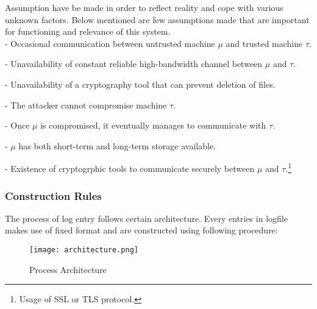 \documentclass[12pt, letter]{article}
\begin{document}
Assumption have be made in order to reflect reality and cope with various unknown factors. Below mentioned are few assumptions made that are important for functioning and relevance of this system.\\

- Occasional communication between untrusted machine $\mu$ and trusted machine $\tau$.

- Unavailability of constant reliable high-bandwidth channel between $\mu$ and $\tau$.

- Unavailability of a cryptography tool that can prevent deletion of files.

- The attacker cannot compromise machine $\tau$.

- Once $\mu$ is compromised, it eventually manages to communicate with $\tau$.

- $\mu$ has both short-term and long-term storage available.

- Existence of cryptogrphic tools to communicate securely between $\mu$ and $\tau$.\footnote{Usage of SSL or TLS protocol.}

\subsubsection{Construction Rules}

The process of log entry follows certain architecture. Every entries in logfile makes use of fixed format and are constructed using following procedure:

\begin{figure}
    \centering
    \texttt{[image: architecture.png]}
    \caption{Process Architecture}
    \label{fig:architecture}
\end{figure}
\end{document}
